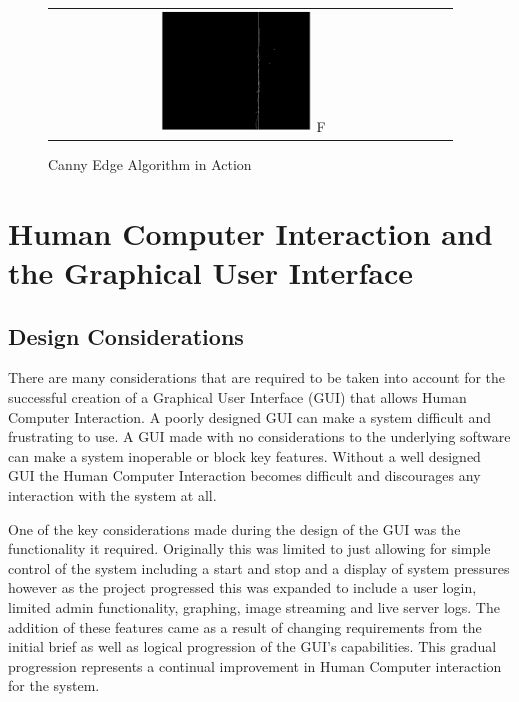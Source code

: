 \begin{figure}[H]
\begin{tabular}{cc}
		\includegraphics[width=0.4\textwidth]{figures/dila_blur9thresh35_2.png} F
	\end{tabular}
	\caption{Canny Edge Algorithm in Action}
	\label{canny_demo}
\end{figure}





\section{Human Computer Interaction and the Graphical User Interface}

\subsection{Design Considerations}

There are many considerations that are required to be taken into account for the successful creation of a Graphical User Interface (GUI) that allows Human Computer Interaction.  A poorly designed GUI can make a system difficult and frustrating to use. A GUI made with no considerations to the underlying software can make a system inoperable or block key features.  Without a well designed GUI the Human Computer Interaction becomes difficult and discourages any interaction with the system at all.

	One of the key considerations made during the design of the GUI was the functionality it required.  Originally this was limited to just allowing for simple control of the system including a start and stop and a display of system pressures however as the project progressed this was expanded to include a user login, limited admin functionality, graphing, image streaming and live server logs.  The addition of these features came as a result of changing requirements from the initial brief as well as logical progression of the GUI's capabilities.  This gradual progression represents a continual improvement in Human Computer interaction for the system.  

